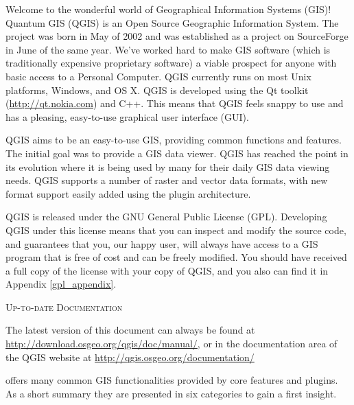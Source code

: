 \mainmatter
\pagestyle{scrheadings}
\label{label_forward}
\setcounter{page}{1}


Welcome to the wonderful world of Geographical Information Systems (GIS)!
Quantum GIS (QGIS) is an Open Source Geographic Information System. The project
was born in May of 2002 and was established as a project on SourceForge in June
of the same year. We've worked hard to make GIS software (which is traditionally
expensive proprietary software) a viable prospect for anyone with basic access
to a Personal Computer. QGIS currently runs on most Unix platforms, Windows, and
OS X. QGIS is developed using the Qt toolkit (\url{http://qt.nokia.com})
and C++. This means that QGIS feels snappy to use and has a pleasing, 
easy-to-use graphical user interface (GUI). 

QGIS aims to be an easy-to-use GIS, providing common functions and features.
The initial goal was to provide a GIS data viewer. QGIS has reached the point
in its evolution where it is being used by many for their daily GIS data viewing
needs. QGIS supports a number of raster and vector data formats, with new
format support easily added using the plugin architecture.

QGIS is released under the GNU General Public License (GPL). Developing QGIS 
under this license means that you can inspect and modify the source code,
and guarantees that you, our happy user, will always have access to a GIS
program that is free of cost and can be freely modified. You should have
received a full copy of the license with your copy of QGIS, and you also can
find it in Appendix \ref{gpl_appendix}.  

\begin{Tip}\caption{\textsc{Up-to-date Documentation}}
The latest version of this document can always be found at 
\url{http://download.osgeo.org/qgis/doc/manual/}, or in the documentation
area of the QGIS website at \url{http://qgis.osgeo.org/documentation/}
\end{Tip}

\label{label_majfeat}

\qg offers many common GIS functionalities provided by core features and
plugins. As a short summary they are presented in six categories to gain a
first insight.

